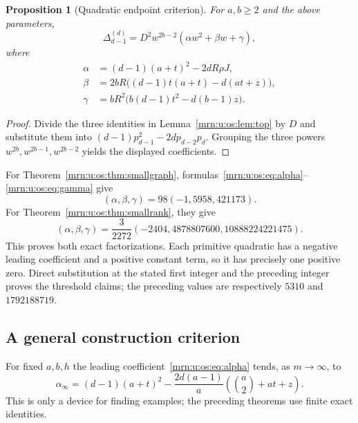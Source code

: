 \documentclass[11pt,a4paper]{article}
\newtheorem{proposition}[theorem]{Proposition}
\theoremstyle{remark}\newtheorem{remark}[theorem]{Remark}
\newcommand{\gap}{\Delta}                  %
\begin{document}
\begin{proposition}[Quadratic endpoint criterion]\label{mrn:u:os:prop:quadratic}
For $a,b\ge2$ and the above parameters,
\begin{equation}\label{mrn:u:os:eq:quadratic}
 \gap_{d-1}^{(d)}=D^2w^{2b-2}(\alpha w^2+\beta w+\gamma),
\end{equation}
where
\begin{align}
 \alpha&=(d-1)(a+t)^2-2dR\rho J,\label{mrn:u:os:eq:alpha}\\
 \beta&=2bR\bigl((d-1)t(a+t)-d(at+z)\bigr),\label{mrn:u:os:eq:beta}\\
 \gamma&=bR^2\bigl(b(d-1)t^2-d(b-1)z\bigr).\label{mrn:u:os:eq:gamma}
\end{align}
\end{proposition}
\begin{proof}
Divide the three identities in Lemma~\ref{mrn:u:os:lem:top} by $D$ and substitute them into $(d-1)p_{d-1}^2-2dp_{d-2}p_d$. Grouping the three powers $w^{2b},w^{2b-1},w^{2b-2}$ yields the displayed coefficients.
\end{proof}
For Theorem~\ref{mrn:u:os:thm:smallgraph}, formulas~\eqref{mrn:u:os:eq:alpha}--\eqref{mrn:u:os:eq:gamma} give
\[
 (\alpha,\beta,\gamma)=98(-1,5958,421173).
\]
For Theorem~\ref{mrn:u:os:thm:smallrank}, they give
\[
 (\alpha,\beta,\gamma)=\frac{3}{2272}
 (-2404,4878807600,10888224221475).
\]
This proves both exact factorizations. Each primitive quadratic has a negative leading coefficient and a positive constant term, so it has precisely one positive zero. Direct substitution at the stated first integer and the preceding integer proves the threshold claims; the preceding values are respectively $5310$ and $1792188719$.

\subsection{A general construction criterion}
For fixed $a,b,h$ the leading coefficient~\eqref{mrn:u:os:eq:alpha} tends, as $m\to\infty$, to
\begin{equation}\label{mrn:u:os:eq:limit}
 \alpha_\infty=(d-1)(a+t)^2-
       \frac{2d(a-1)}a\left(\binom a2+at+z\right).
\end{equation}
This is only a device for finding examples; the preceding theorems use finite exact identities.
\end{document}
